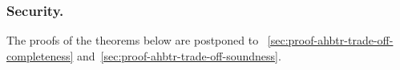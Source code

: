 \label{sec:ahbtr-trade-off}





\subsubsection{Security.}
The proofs of the theorems below are postponed to \Sections~\ref{sec:proof-ahbtr-trade-off-completeness} and~\ref{sec:proof-ahbtr-trade-off-soundness}.


